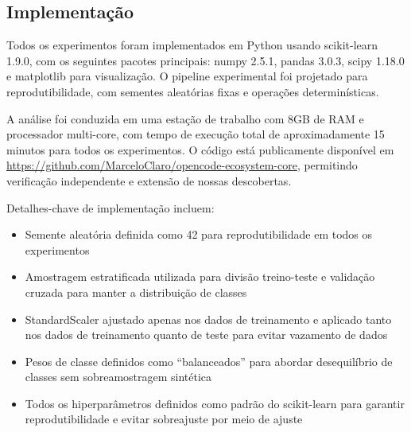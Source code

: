\subsection{Implementação}

Todos os experimentos foram implementados em Python usando scikit-learn 
1.9.0, com os seguintes pacotes principais: numpy 2.5.1, pandas 3.0.3, 
scipy 1.18.0 e matplotlib para visualização. O pipeline experimental foi 
projetado para reprodutibilidade, com sementes aleatórias fixas e operações 
determinísticas.

A análise foi conduzida em uma estação de trabalho com 8GB de RAM e 
processador multi-core, com tempo de execução total de aproximadamente 15 
minutos para todos os experimentos. O código está publicamente disponível 
em \url{https://github.com/MarceloClaro/opencode-ecosystem-core}, permitindo 
verificação independente e extensão de nossas descobertas.

Detalhes-chave de implementação incluem:

\begin{itemize}[leftmargin=*]
    \item Semente aleatória definida como 42 para reprodutibilidade em 
          todos os experimentos
    \item Amostragem estratificada utilizada para divisão treino-teste e 
          validação cruzada para manter a distribuição de classes
    \item StandardScaler ajustado apenas nos dados de treinamento e aplicado 
          tanto nos dados de treinamento quanto de teste para evitar vazamento 
          de dados
    \item Pesos de classe definidos como ``balanceados'' para abordar 
          desequilíbrio de classes sem sobreamostragem sintética
    \item Todos os hiperparâmetros definidos como padrão do scikit-learn 
          para garantir reprodutibilidade e evitar sobreajuste por meio 
          de ajuste
\end{itemize}

